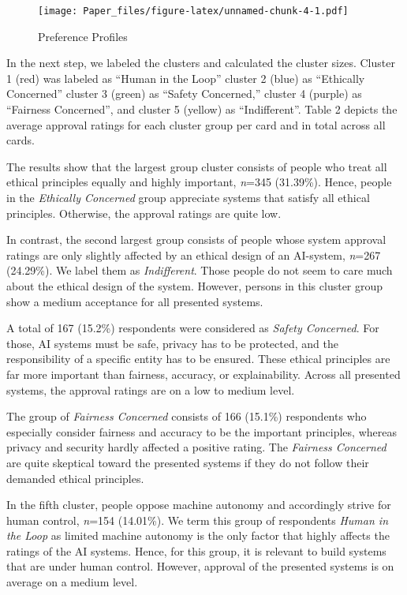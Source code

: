 \documentclass{article}
\begin{document}
\begin{figure}
\centering
\texttt{[image: Paper\_files/figure-latex/unnamed-chunk-4-1.pdf]}
\caption{Preference Profiles}
\end{figure}

In the next step, we labeled the clusters and calculated the cluster
sizes. Cluster 1 (red) was labeled as ``Human in the Loop'' cluster 2
(blue) as ``Ethically Concerned'' cluster 3 (green) as ``Safety
Concerned,'' cluster 4 (purple) as ``Fairness Concerned'', and cluster 5
(yellow) as ``Indifferent''. Table 2 depicts the average approval
ratings for each cluster group per card and in total across all cards.

The results show that the largest group cluster consists of people who
treat all ethical principles equally and highly important, \emph{n}=345
(31.39\%). Hence, people in the \emph{Ethically Concerned} group
appreciate systems that satisfy all ethical principles. Otherwise, the
approval ratings are quite low.

In contrast, the second largest group consists of people whose system
approval ratings are only slightly affected by an ethical design of an
AI-system, \emph{n}=267 (24.29\%). We label them as \emph{Indifferent}.
Those people do not seem to care much about the ethical design of the
system. However, persons in this cluster group show a medium acceptance
for all presented systems.

A total of 167 (15.2\%) respondents were considered as \emph{Safety
Concerned}. For those, AI systems must be safe, privacy has to be
protected, and the responsibility of a specific entity has to be
ensured. These ethical principles are far more important than fairness,
accuracy, or explainability. Across all presented systems, the approval
ratings are on a low to medium level.

The group of \emph{Fairness Concerned} consists of 166 (15.1\%)
respondents who especially consider fairness and accuracy to be the
important principles, whereas privacy and security hardly affected a
positive rating. The \emph{Fairness Concerned} are quite skeptical
toward the presented systems if they do not follow their demanded
ethical principles.

In the fifth cluster, people oppose machine autonomy and accordingly
strive for human control, \emph{n}=154 (14.01\%). We term this group of
respondents \emph{Human in the Loop} as limited machine autonomy is the
only factor that highly affects the ratings of the AI systems. Hence,
for this group, it is relevant to build systems that are under human
control. However, approval of the presented systems is on average on a
medium level.
\end{document}

